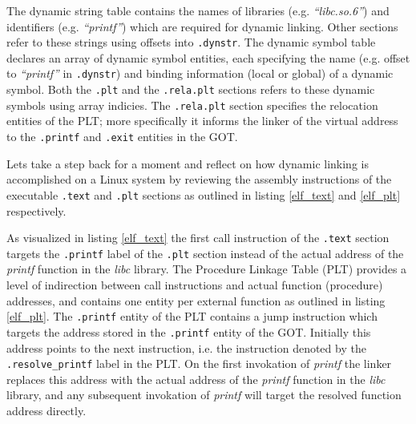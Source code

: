 \documentclass[12pt, a4paper]{article}
\begin{document}
The dynamic string table contains the names of libraries (e.g. \textit{``libc.so.6''}) and identifiers (e.g. \textit{``printf''}) which are required for dynamic linking. Other sections refer to these strings using offsets into \texttt{.dynstr}. The dynamic symbol table declares an array of dynamic symbol entities, each specifying the name (e.g. offset to \textit{``printf''} in \texttt{.dynstr}) and binding information (local or global) of a dynamic symbol. Both the \texttt{.plt} and the \texttt{.rela.plt} sections refers to these dynamic symbols using array indicies. The \texttt{.rela.plt} section specifies the relocation entities of the PLT; more specifically it informs the linker of the virtual address to the \texttt{.printf} and \texttt{.exit} entities in the GOT.

Lets take a step back for a moment and reflect on how dynamic linking is accomplished on a Linux system by reviewing the assembly instructions of the executable \texttt{.text} and \texttt{.plt} sections as outlined in listing \ref{elf_text} and \ref{elf_plt} respectively.





As visualized in listing \ref{elf_text} the first call instruction of the \texttt{.text} section targets the \texttt{.printf} label of the \texttt{.plt} section instead of the actual address of the \textit{printf} function in the \textit{libc} library. The Procedure Linkage Table (PLT) provides a level of indirection between call instructions and actual function (procedure) addresses, and contains one entity per external function as outlined in listing \ref{elf_plt}. The \texttt{.printf} entity of the PLT contains a jump instruction which targets the address stored in the \texttt{.printf} entity of the GOT. Initially this address points to the next instruction, i.e. the instruction denoted by the \texttt{.resolve\_printf} label in the PLT. On the first invokation of \textit{printf} the linker replaces this address with the actual address of the \textit{printf} function in the \textit{libc} library, and any subsequent invokation of \textit{printf} will target the resolved function address directly.
\end{document}
